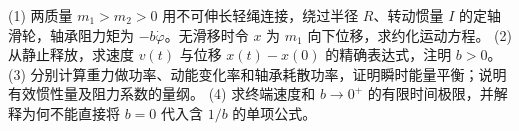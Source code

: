 (1) 两质量 \(m_1>m_2>0\) 用不可伸长轻绳连接，绕过半径 \(R\)、转动惯量 \(I\) 的定轴滑轮，轴承阻力矩为 \(-b\dot\varphi\)。无滑移时令 \(x\) 为 \(m_1\) 向下位移，求约化运动方程。
(2) 从静止释放，求速度 \(v(t)\) 与位移 \(x(t)-x(0)\) 的精确表达式，注明 \(b>0\)。
(3) 分别计算重力做功率、动能变化率和轴承耗散功率，证明瞬时能量平衡；说明有效惯性量及阻力系数的量纲。
(4) 求终端速度和 \(b\to0^+\) 的有限时间极限，并解释为何不能直接将 \(b=0\) 代入含 \(1/b\) 的单项公式。
